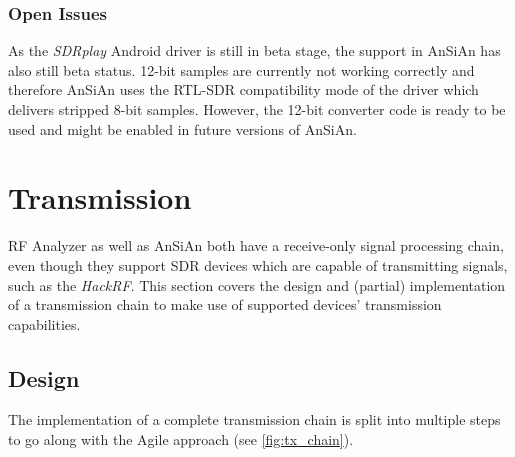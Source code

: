 \subsubsection{Open Issues}

As the \emph{SDRplay} Android driver is still in beta stage, the support in AnSiAn has
also still beta status. 12-bit samples are currently not working correctly and
therefore \ac{AnSiAn} uses the RTL-SDR compatibility mode of the driver which
delivers stripped 8-bit samples. However, the 12-bit converter code is ready to
be used and might be enabled in future versions of \ac{AnSiAn}.


\section{Transmission\label{sec:transmission}}

RF Analyzer as well as \ac{AnSiAn} both have a receive-only signal processing chain, even though they support \ac{SDR} devices which are capable of transmitting signals, such as the \emph{HackRF}. This section covers the design and (partial) implementation of a transmission chain to make use of supported devices' transmission capabilities.


\subsection{Design}

The implementation of a complete transmission chain is split into multiple steps
to go along with the Agile approach (see \autoref{fig:tx_chain}).


